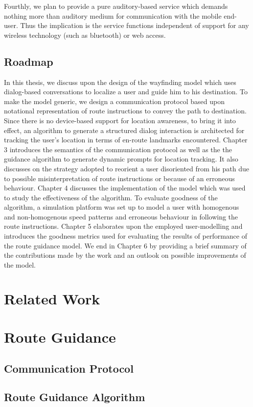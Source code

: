 \documentclass{iitkthesis}
\begin{document}
Fourthly, we plan to provide a pure auditory-based service which demands nothing more than auditory medium for communication with the mobile end-user. Thus the implication is the service functions independent of support for any wireless technology (such as bluetooth) or web access.
  \section{Roadmap}
  In this thesis, we discuss upon the design of the wayfinding model which uses dialog-based conversations to localize a user and guide him to his destination. To make the model generic, we design a communication protocol based upon notational representation of route instructions to convey the path to destination. Since there is no device-based support for location awareness, to bring it into effect, an algorithm to generate a structured dialog interaction is architected for tracking the user's location in terms of en-route landmarks encountered. Chapter 3 introduces the semantics of the communication protocol as well as the the guidance algorithm to generate dynamic prompts for location tracking. It also discusses on the strategy adopted to reorient a user disoriented from his path due to possible misinterpretation of route instructions or because of an erroneous behaviour. Chapter 4 discusses the implementation of the model which was used to study the effectiveness of the algorithm. To evaluate goodness of the algorithm, a simulation platform was set up to model a user with homogenous and non-homogenous speed patterns and erroneous behaviour in following the route instructions. Chapter 5 elaborates upon the employed user-modelling and introduces the goodness metrics used for evaluating the results of performance of the route guidance model. We end in Chapter 6 by providing a brief summary of the contributions made by the work and an outlook on possible improvements of the model.
 \chapter{Related Work}
 \chapter{Route Guidance}
 \section{Communication Protocol}
 \section{Route Guidance Algorithm}
\end{document}
